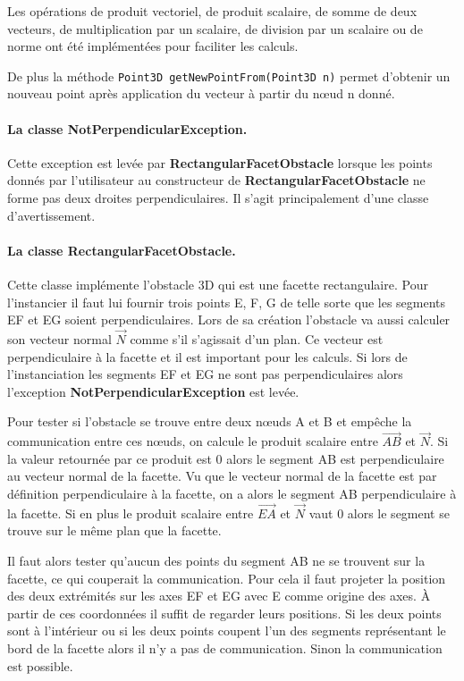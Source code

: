 \documentclass{article}
\begin{document}
Les opérations de produit vectoriel, de produit scalaire, de somme de deux vecteurs, de multiplication par un scalaire, de division par un scalaire ou de norme ont été implémentées pour faciliter les calculs.\medskip
 
De plus la méthode \texttt{Point3D getNewPointFrom(Point3D n)} permet d'obtenir un nouveau point après application du vecteur à partir du n\oe ud n donné.

\paragraph{La classe NotPerpendicularException.}

Cette exception est levée par \textbf{RectangularFacet\-Obstacle} lorsque les points donnés par l'utilisateur au constructeur de \textbf{RectangularFacetObstacle} ne forme pas deux droites perpendiculaires. Il s'agit principalement d'une classe d'avertissement.

\paragraph{La classe RectangularFacetObstacle.}

Cette classe implémente l'obstacle 3D qui est une facette rectangulaire. Pour l'instancier il faut lui fournir trois points E, F, G de telle sorte que les segments EF et EG soient perpendiculaires. Lors de sa création l'obstacle va aussi calculer son vecteur normal $\overrightarrow{N}$ comme s'il s'agissait d'un plan. Ce vecteur est perpendiculaire à la facette et il est important pour les calculs.
Si lors de l'instanciation les segments EF et EG ne sont pas perpendiculaires alors l'exception  \textbf{NotPerpendicularException} est levée.\medskip

Pour tester si l'obstacle se trouve entre deux n\oe uds A et B et empêche la communication entre ces n\oe uds, on calcule le produit scalaire entre $\overrightarrow{AB}$ et $\overrightarrow{N}$. Si la valeur retournée par ce produit est 0 alors le segment AB est perpendiculaire au vecteur normal de la facette. Vu que le vecteur normal de la facette est par définition perpendiculaire à la facette, on a alors le segment AB perpendiculaire à la facette. Si en plus le produit scalaire entre $\overrightarrow{EA}$ et $\overrightarrow{N}$ vaut 0 alors le segment se trouve sur le même plan que la facette.\medskip

Il faut alors tester qu'aucun des points du segment AB ne se trouvent sur la facette, ce qui couperait la communication. Pour cela il faut projeter la position des deux extrémités sur les axes EF et EG avec E comme origine des axes. À partir de ces coordonnées il suffit de regarder leurs positions. Si les deux points sont à l'intérieur ou si les deux points coupent l'un des segments représentant le bord de la facette alors il n'y a pas de communication. Sinon la communication est possible.\medskip
\end{document}
